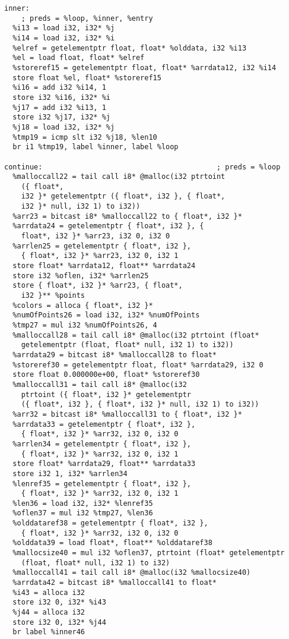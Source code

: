 \documentclass[main.tex]{subfiles}
\begin{document}
{\begin{lstlisting}
inner:                                            
    ; preds = %loop, %inner, %entry
  %i13 = load i32, i32* %j
  %i14 = load i32, i32* %i
  %elref = getelementptr float, float* %olddata, i32 %i13
  %el = load float, float* %elref
  %storeref15 = getelementptr float, float* %arrdata12, i32 %i14
  store float %el, float* %storeref15
  %i16 = add i32 %i14, 1
  store i32 %i16, i32* %i
  %j17 = add i32 %i13, 1
  store i32 %j17, i32* %j
  %j18 = load i32, i32* %j
  %tmp19 = icmp slt i32 %j18, %len10
  br i1 %tmp19, label %inner, label %loop

continue:                                         ; preds = %loop
  %malloccall22 = tail call i8* @malloc(i32 ptrtoint
    ({ float*, 
    i32 }* getelementptr ({ float*, i32 }, { float*,
    i32 }* null, i32 1) to i32))
  %arr23 = bitcast i8* %malloccall22 to { float*, i32 }*
  %arrdata24 = getelementptr { float*, i32 }, { 
    float*, i32 }* %arr23, i32 0, i32 0
  %arrlen25 = getelementptr { float*, i32 },
    { float*, i32 }* %arr23, i32 0, i32 1
  store float* %arrdata12, float** %arrdata24
  store i32 %oflen, i32* %arrlen25
  store { float*, i32 }* %arr23, { float*,
    i32 }** %points
  %colors = alloca { float*, i32 }*
  %numOfPoints26 = load i32, i32* %numOfPoints
  %tmp27 = mul i32 %numOfPoints26, 4
  %malloccall28 = tail call i8* @malloc(i32 ptrtoint (float* 
    getelementptr (float, float* null, i32 1) to i32))
  %arrdata29 = bitcast i8* %malloccall28 to float*
  %storeref30 = getelementptr float, float* %arrdata29, i32 0
  store float 0.000000e+00, float* %storeref30
  %malloccall31 = tail call i8* @malloc(i32
    ptrtoint ({ float*, i32 }* getelementptr
    ({ float*, i32 }, { float*, i32 }* null, i32 1) to i32))
  %arr32 = bitcast i8* %malloccall31 to { float*, i32 }*
  %arrdata33 = getelementptr { float*, i32 }, 
    { float*, i32 }* %arr32, i32 0, i32 0
  %arrlen34 = getelementptr { float*, i32 }, 
    { float*, i32 }* %arr32, i32 0, i32 1
  store float* %arrdata29, float** %arrdata33
  store i32 1, i32* %arrlen34
  %lenref35 = getelementptr { float*, i32 },
    { float*, i32 }* %arr32, i32 0, i32 1
  %len36 = load i32, i32* %lenref35
  %oflen37 = mul i32 %tmp27, %len36
  %olddataref38 = getelementptr { float*, i32 }, 
    { float*, i32 }* %arr32, i32 0, i32 0
  %olddata39 = load float*, float** %olddataref38
  %mallocsize40 = mul i32 %oflen37, ptrtoint (float* getelementptr 
    (float, float* null, i32 1) to i32)
  %malloccall41 = tail call i8* @malloc(i32 %mallocsize40)
  %arrdata42 = bitcast i8* %malloccall41 to float*
  %i43 = alloca i32
  store i32 0, i32* %i43
  %j44 = alloca i32
  store i32 0, i32* %j44
  br label %inner46


\end{lstlisting}}
\end{document}
